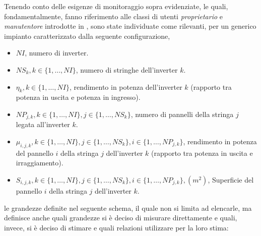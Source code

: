 %
Tenendo conto delle esigenze di monitoraggio sopra evidenziate, le quali, fondamentalmente, 
fanno riferimento alle classi di utenti \emph{proprietario} e \emph{manutentore} introdotte in 
\cite{kolodenny08}, sono state individuate come rilevanti, per un generico impianto 
caratterizzato dalla seguente configurazione,
\begin{itemize}
\item $NI$, numero di inverter.
\item $NS_k, k \in \{1, \dots, NI\}$, numero di stringhe dell'inverter $k$.
\item $\eta _{k}, k \in \{1, \dots, NI\}$, rendimento in potenza
  dell'inverter $k$ (rapporto tra
  potenza in uscita e potenza in ingresso).
\item $NP_{j,k}, k \in \{1, \dots, NI\}, j \in \{1, \dots, NS_k\}$, numero
  di pannelli della stringa $j$ legata all'inverter $k$.
\item $\mu _{i,j,k}, k \in \{1, \dots, NI\}, j \in \{1, \dots, NS_k\}, i \in
  \{1, \dots, NP_{j,k}\}$, rendimento in potenza del pannello $i$ della stringa
  $j$ dell'inverter $k$ (rapporto tra  potenza in uscita e irraggiamento).
\item $S _{i,j,k}, k \in \{1, \dots, NI\}, j \in \{1, \dots, NS_k\}, i \in
  \{1, \dots, NP_{j,k}\}, (m^2)$, Superficie del pannello $i$ della stringa
  $j$ dell'inverter $k$.
\end{itemize}
%
le grandezze definite nel seguente schema, il quale non si limita ad elencarle, 
ma definisce anche quali grandezze si \`e deciso di misurare direttamente e 
quali, invece, si \`e deciso di stimare e quali relazioni utilizzare per la
loro stima:
%
